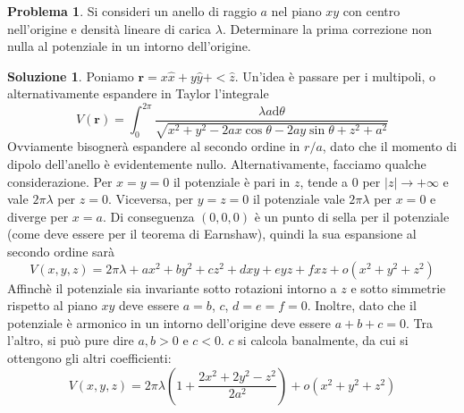 \documentclass[a4paper,11pt]{book}
\newcommand{\dif}{\mathrm{d}}
\renewcommand{\vec}[1]{\mathbf{#1}}
\theoremstyle{theorem}
\theoremstyle{definition}
\newtheorem{problema}{Problema}[section]
\newtheorem{soluzione}{Soluzione}[section]
\begin{document}
\begin{problema}
	Si consideri un anello di raggio $a$ nel piano $xy$ con centro nell'origine e densità lineare di carica $\lambda$. Determinare la prima correzione non nulla al potenziale in un intorno dell'origine.
\end{problema}
\begin{soluzione}
	Poniamo $\vec{r}=x\hat{x}+y\hat{y}+<\hat{z}$. Un'idea è passare per i multipoli, o alternativamente espandere in Taylor l'integrale
	\[V(\vec{r})=\int_{0}^{2\pi}\frac{\lambda a\dif \theta}{\sqrt{x^2+y^2-2ax\cos\theta-2ay\sin\theta+z^2+a^2}}\]
	Ovviamente bisognerà espandere al secondo ordine in $r/a$, dato che il momento di dipolo dell'anello è evidentemente nullo. Alternativamente, facciamo qualche considerazione. Per $x=y=0$ il potenziale è pari in $z$, tende a 0 per $|z|\to+\infty$ e vale $2\pi\lambda$ per $z=0$. Viceversa, per $y=z=0$ il potenziale vale $2\pi\lambda$ per $x=0$ e diverge per $x=a$. Di conseguenza $(0,0,0)$ è un punto di sella per il potenziale (come deve essere per il teorema di Earnshaw), quindi la sua espansione al secondo ordine sarà
	\[V(x,y,z)=2\pi\lambda+ax^2+by^2+cz^2+dxy+eyz+fxz+o(x^2+y^2+z^2)\]
	Affinchè il potenziale sia invariante sotto rotazioni intorno a $z$ e sotto simmetrie rispetto al piano $xy$ deve essere $a=b$, $c$, $d=e=f=0$. Inoltre, dato che il potenziale è armonico in un intorno dell'origine deve essere $a+b+c=0$. Tra l'altro, si può pure dire $a,b>0$ e $c<0$. $c$ si calcola banalmente, da cui si ottengono gli altri coefficienti:
	\[V(x,y,z)=2\pi\lambda\left(1+\frac{2x^2+2y^2-z^2}{2a^2}\right)+o(x^2+y^2+z^2)\]
\end{soluzione}
\newpage
\end{document}
